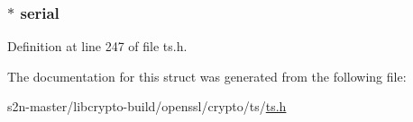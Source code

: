 \subsubsection[{\texorpdfstring{serial}{serial}}]{ $\ast$ serial}\hypertarget{struct_e_s_s__issuer__serial_ae89753d950d21e4c15c296fced78c1b6}{}\label{struct_e_s_s__issuer__serial_ae89753d950d21e4c15c296fced78c1b6}


Definition at line 247 of file ts.\+h.



The documentation for this struct was generated from the following file\+:\begin{DoxyCompactItemize}
\item 
s2n-\/master/libcrypto-\/build/openssl/crypto/ts/\hyperlink{crypto_2ts_2ts_8h}{ts.\+h}\end{DoxyCompactItemize}
